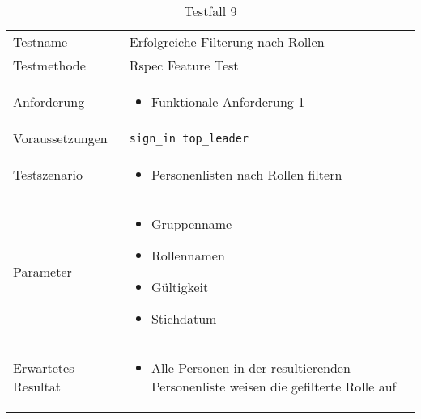 \newpage

\begin{table}[h!]
   \begin{tabular}{|L{0.4\textwidth}|L{0.6\textwidth}|}
       \hline
         \\[12pt]
       \hline
        Testname & Erfolgreiche Filterung nach Rollen \\
       \hline
       Testmethode & Rspec Feature Test \\
       \hline
        Anforderung & 
        \begin{itemize}
         \item Funktionale Anforderung 1
         \end{itemize}  \\
       \hline
       Voraussetzungen & \texttt{sign\_in top\_leader} \\
       \hline
       Testszenario & 
       \begin{itemize}
         \item Personenlisten nach Rollen filtern
       \end{itemize} \\
       \hline
       Parameter & 
       \begin{itemize}
         \item Gruppenname
         \item Rollennamen
         \item Gültigkeit 
         \item Stichdatum
       \end{itemize}
       \\
       \hline
       Erwartetes Resultat & 
       \begin{itemize}
         \item Alle Personen in der resultierenden Personenliste weisen die gefilterte Rolle auf
       \end{itemize} \\
     \hline
     \end{tabular}
     \caption{Testfall 9}
\end{table}

\newpage


